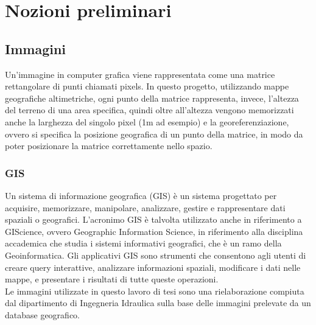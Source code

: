 \chapter{Nozioni preliminari}

\section{Immagini}
	Un'immagine in computer grafica viene rappresentata come una matrice rettangolare di punti chiamati pixels. 
	In questo progetto, utilizzando mappe geografiche altimetriche, ogni punto della matrice rappresenta, invece, l'altezza del terreno di una area specifica, quindi oltre all'altezza vengono memorizzati anche la larghezza del singolo pixel (1m ad esempio) e la georeferenziazione, ovvero si specifica la posizione geografica di un punto della matrice, in modo da poter posizionare la matrice correttamente nello spazio. 

	\subsection{GIS}	
		Un sistema di informazione geografica (GIS) \`{e} un sistema progettato per acquisire, memorizzare, manipolare, analizzare, gestire e rappresentare dati spaziali o geografici. L'acronimo GIS \`{e} talvolta utilizzato anche in riferimento a GIScience, ovvero Geographic Information Science, in riferimento alla disciplina accademica che studia i sistemi informativi geografici, che \`{e} un ramo della Geoinformatica. Gli applicativi GIS sono strumenti che consentono agli utenti di creare query interattive, analizzare informazioni spaziali, modificare i dati nelle mappe, e presentare i risultati di tutte queste operazioni. \cite{gis}\\
		Le immagini utilizzate in questo lavoro di tesi sono una rielaborazione compiuta dal dipartimento di Ingegneria Idraulica sulla base delle immagini prelevate da un database geografico.

